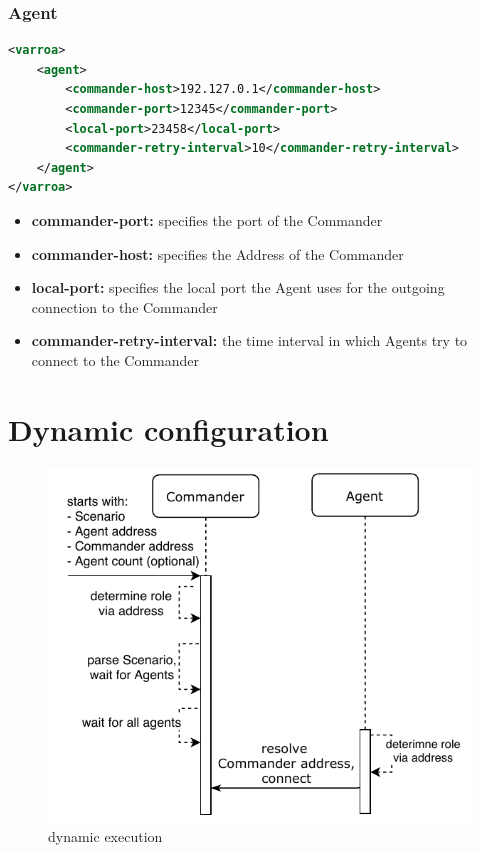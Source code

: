 \subsubsection{Agent}\label{sec:agentConfig}
\begin{lstlisting}[caption={Agent XML configuration example}, captionpos=b, label={lst:agentConfig}, language=XML]
<varroa>
    <agent>
		<commander-host>192.127.0.1</commander-host>
        <commander-port>12345</commander-port>
        <local-port>23458</local-port>
		<commander-retry-interval>10</commander-retry-interval>
    </agent>
</varroa>
\end{lstlisting}
\begin{itemize}
	\item \textbf{commander-port:} specifies the port of the Commander
	\item \textbf{commander-host:} specifies the Address of the Commander
	\item \textbf{local-port:} specifies the local port the Agent uses for the outgoing connection to the Commander %
	\item \textbf{commander-retry-interval:} the time interval in which Agents try to connect to the Commander
\end{itemize}

\section{Dynamic configuration}

\begin{figure}[h]
\begin{center}
\includegraphics[scale=1]{Resources/PDF/ExecutionDnsInit}
\caption{dynamic execution}
\label{pic:dynamicExecution}
\end{center}
\end{figure}

